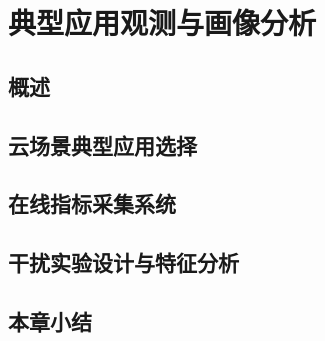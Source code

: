 \chapter{典型应用观测与画像分析}\label{chap:profiling}

\section{概述}


\section{云场景典型应用选择}


\section{在线指标采集系统}


\section{干扰实验设计与特征分析}


\section{本章小结}